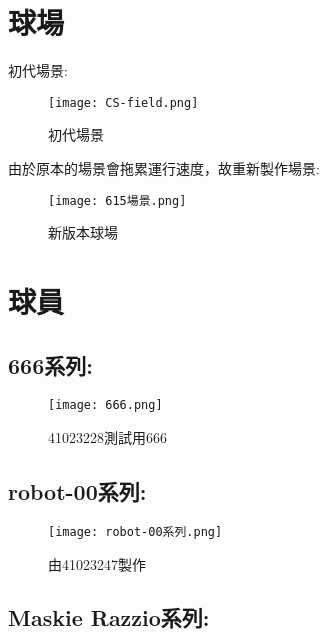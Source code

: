 \newpage
\section{球場}
\begin{flushleft}
\fontsize{14pt}{10pt}\sectionef\hspace{12pt}\quad 初代場景:
\end{flushleft}
\begin{figure}[h]
\texttt{[image: CS-field.png]}
\caption{初代場景}
\end{figure}

\begin{flushleft}
\fontsize{14pt}{10pt}\sectionef\hspace{12pt}\quad 由於原本的場景會拖累運行速度，故重新製作場景:
\end{flushleft}
\begin{figure}[h]
\texttt{[image: 615場景.png]}
\caption{新版本球場}
\end{figure}

\newpage
\section{球員}

\subsection{666系列:}
\begin{figure}[h]
\texttt{[image: 666.png]}
\caption{41023228測試用666}
\end{figure}

\subsection{robot-00系列:}
\begin{figure}[h]
\texttt{[image: robot-00系列.png]}
\caption{由41023247製作}
\end{figure}

\newpage
\subsection{Maskie Razzio系列:}

